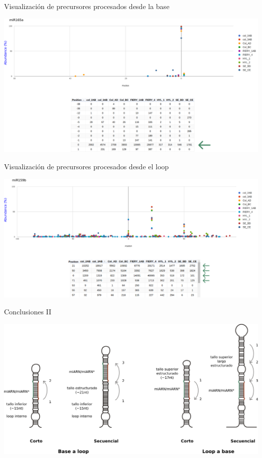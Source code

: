 \documentclass{beamer}
\begin{document}
\begin{frame}{Visualización de precursores procesados desde la base}
	\begin{center}
		\includegraphics[width=1\textwidth]{img/miR165a_SPARE.png}
	\end{center}
\end{frame}

\begin{frame}{Visualización de precursores procesados desde el loop}
	\begin{center}
		\includegraphics[width=1\textwidth]{img/miR159b_SPARE.png}
	\end{center}
\end{frame}


\begin{frame}{Conclusiones II}
	\begin{center}
		\includegraphics[width=1\textwidth]{img/mecanismos_conclusionII.png}
	\end{center}
\end{frame}
\end{document}
